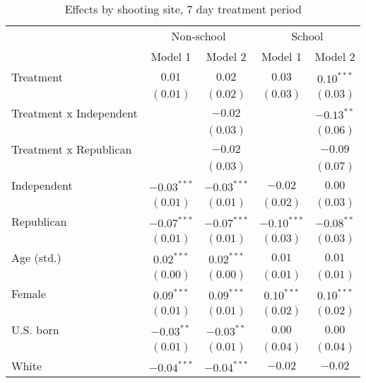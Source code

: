 
\begin{table}
\caption{Effects by shooting site, 7 day treatment period}
\begin{center}
\begin{tabular}{l c c c c}
\toprule
 & \multicolumn{2}{c}{Non-school} & \multicolumn{2}{c}{School} \\
\cmidrule(lr){2-3} \cmidrule(lr){4-5}
 & Model 1 & Model 2 & Model 1 & Model 2 \\
\midrule
Treatment               & $0.01$        & $0.02$        & $0.03$        & $0.10^{***}$  \\
                        & $(0.01)$      & $(0.02)$      & $(0.03)$      & $(0.03)$      \\
Treatment x Independent &               & $-0.02$       &               & $-0.13^{**}$  \\
                        &               & $(0.03)$      &               & $(0.06)$      \\
Treatment x Republican  &               & $-0.02$       &               & $-0.09$       \\
                        &               & $(0.03)$      &               & $(0.07)$      \\
Independent             & $-0.03^{***}$ & $-0.03^{***}$ & $-0.02$       & $0.00$        \\
                        & $(0.01)$      & $(0.01)$      & $(0.02)$      & $(0.03)$      \\
Republican              & $-0.07^{***}$ & $-0.07^{***}$ & $-0.10^{***}$ & $-0.08^{**}$  \\
                        & $(0.01)$      & $(0.01)$      & $(0.03)$      & $(0.03)$      \\
Age (std.)              & $0.02^{***}$  & $0.02^{***}$  & $0.01$        & $0.01$        \\
                        & $(0.00)$      & $(0.00)$      & $(0.01)$      & $(0.01)$      \\
Female                  & $0.09^{***}$  & $0.09^{***}$  & $0.10^{***}$  & $0.10^{***}$  \\
                        & $(0.01)$      & $(0.01)$      & $(0.02)$      & $(0.02)$      \\
U.S. born               & $-0.03^{**}$  & $-0.03^{**}$  & $0.00$        & $0.00$        \\
                        & $(0.01)$      & $(0.01)$      & $(0.04)$      & $(0.04)$      \\
White                   & $-0.04^{***}$ & $-0.04^{***}$ & $-0.02$       & $-0.02$       \\

\end{tabular}
\end{center}
\end{table}
